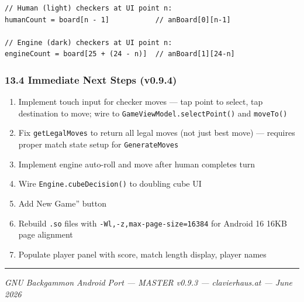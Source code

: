 \documentclass[11pt,a4paper]{article}
\providecommand{\tightlist}{\setlength{\itemsep}{2pt}\setlength{\parskip}{0pt}}
\begin{document}
\begin{verbatim}
// Human (light) checkers at UI point n:
humanCount = board[n - 1]           // anBoard[0][n-1]

// Engine (dark) checkers at UI point n:
engineCount = board[25 + (24 - n)]  // anBoard[1][24-n]
\end{verbatim}

\subsubsection{13.4 Immediate Next Steps
(v0.9.4)}\label{immediate-next-steps-v094}

\begin{enumerate}
\def\labelenumi{\arabic{enumi}.}
\tightlist
\item
  Implement touch input for checker moves --- tap point to select, tap
  destination to move; wire to \texttt{GameViewModel.selectPoint()} and
  \texttt{moveTo()}
\item
  Fix \texttt{getLegalMoves} to return all legal moves (not just best
  move) --- requires proper match state setup for
  \texttt{GenerateMoves}
\item
  Implement engine auto-roll and move after human completes turn
\item
  Wire \texttt{Engine.cubeDecision()} to doubling cube UI
\item
  Add New Game'' button
\item
  Rebuild \texttt{.so} files with \texttt{-Wl,-z,max-page-size=16384}
  for Android 16 16KB page alignment
\item
  Populate player panel with score, match length display, player names
\end{enumerate}

\begin{center}\rule{0.5\linewidth}{0.5pt}\end{center}

\emph{GNU Backgammon Android Port --- MASTER v0.9.3 --- clavierhaus.at
--- June 2026}
\end{document}
